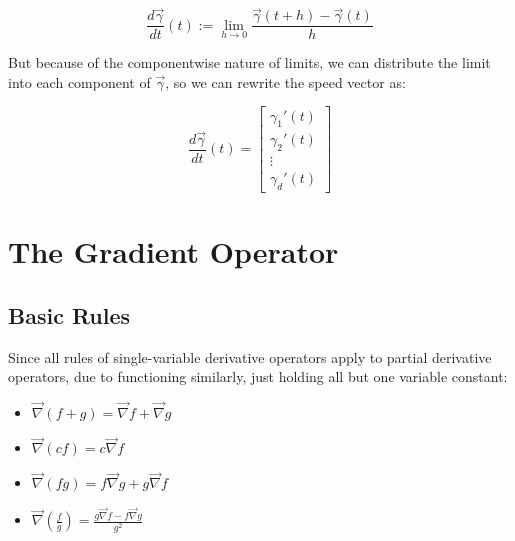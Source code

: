 \documentclass[11 pt, twoside]{article}
\begin{document}
$$\frac{d\vec{\gamma}}{dt}(t) := \lim_{h\to0} \frac{\vec{\gamma}(t + h) - \vec{\gamma}(t)}{h}$$

But because of the componentwise nature of limits, we can distribute the limit
into each component of $\vec{\gamma}$, so we can rewrite the speed vector as:

\begin{equation*}
    \frac{d\vec{\gamma}}{dt}(t) = \left[
    \begin{array}{c}
        \gamma_1' (t)\\
        \gamma_2' (t)\\
        \vdots\\
        \gamma_d' (t)
    \end{array} \right]
\end{equation*}

\section{The Gradient Operator}

\subsection{Basic Rules}

Since all rules of single-variable derivative operators apply to partial derivative operators, due to functioning similarly, just holding all but one variable constant:

\begin{itemize}
\item $\vec{\nabla}(f + g) = \vec{\nabla}f + \vec{\nabla}g$
\item $\vec{\nabla}(cf) = c\vec{\nabla}f$
\item $\vec{\nabla}(fg) = f\vec{\nabla}g + g\vec{\nabla}f$
\item $\vec{\nabla}(\frac{f}{g}) = \frac{g\vec{\nabla}f - f\vec{\nabla}g}{g^2}$
\end{itemize}
\end{document}
